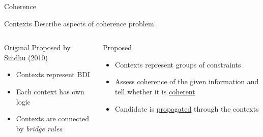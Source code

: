 \begin{frame}{Coherence}
  \begin{block}{Contexts}
    Describe aspects of coherence problem.
    \begin{columns}[t]
      \begin{column}{.5\textwidth}
        \begin{block}{Original}
          Proposed by Sindhu (2010) \\\medskip
          \begin{itemize}
            \item Contexts represent BDI
            \item Each context has own logic
            \item Contexts are connected by
                  \emph{bridge rules}
          \end{itemize}
        \end{block}
      \end{column}
      \begin{column}{.5\textwidth}
        \begin{block}{Proposed}
          \begin{itemize}
            \item Contexts represent groups of constraints
            \item \underline{Assess coherence}
                  of the given information and tell whether
                  it is \underline{coherent}
            \item Candidate is \alert{\underline{propagated}} through
                  the contexts
          \end{itemize}
        \end{block}
      \end{column}
    \end{columns}
  \end{block}
\end{frame}


